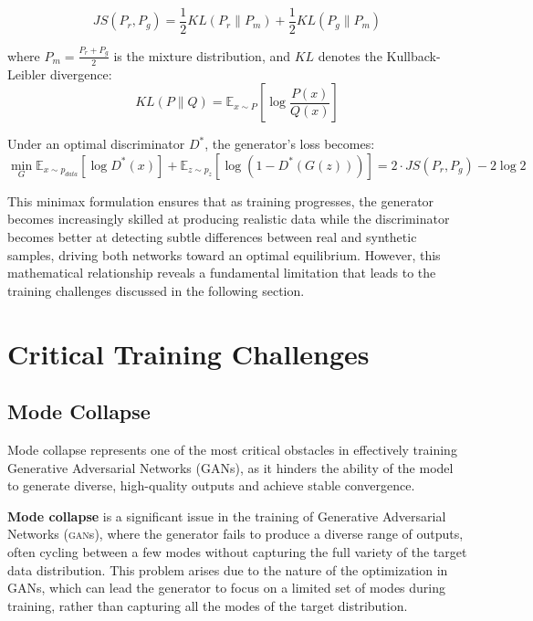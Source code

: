 \begin{equation}
JS(P_r, P_g) = \frac{1}{2}KL(P_r \| P_m) + \frac{1}{2}KL(P_g \| P_m)
\end{equation}

where $P_m = \frac{P_r + P_g}{2}$ is the mixture distribution, and $KL$ denotes the Kullback-Leibler divergence:
\begin{equation}
KL(P \| Q) = \mathbb{E}_{x \sim P}\left[\log\frac{P(x)}{Q(x)}\right]
\end{equation}

Under an optimal discriminator $D^*$, the generator's loss becomes:
\begin{equation}
\min_G \mathbb{E}_{x \sim p_{data}}[\log D^*(x)] + \mathbb{E}_{z \sim p_z}[\log(1-D^*(G(z)))] = 2 \cdot JS(P_r, P_g) - 2\log 2
\end{equation}

This minimax formulation ensures that as training progresses, the generator becomes increasingly skilled at producing realistic data while the discriminator becomes better at detecting subtle differences between real and synthetic samples, driving both networks toward an optimal equilibrium. However, this mathematical relationship reveals a fundamental limitation that leads to the training challenges discussed in the following section.

\section{Critical Training Challenges}

\subsection{Mode Collapse}

Mode collapse represents one of the most critical obstacles in effectively training Generative Adversarial Networks (GANs), as it hinders the ability of the model to generate diverse, high-quality outputs and achieve stable convergence\cite{goodfellow2016tutorial}.

\textbf{Mode collapse} is a significant issue in the training of Generative Adversarial Networks (\textsc{gan}s), where the generator fails to produce a diverse range of outputs, often cycling between a few modes without capturing the full variety of the target data distribution. This problem arises due to the nature of the optimization in GANs, which can lead the generator to focus on a limited set of modes during training, rather than capturing all the modes of the target distribution.

